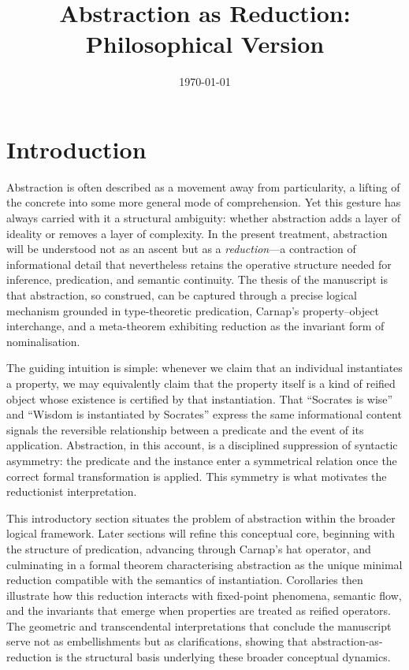 \documentclass[12pt,letterpaper]{article}
\title{Abstraction as Reduction: Philosophical Version}
\author{\Flyxion}
\date{\today}
\begin{document}
\maketitle

\section{Introduction}

Abstraction is often described as a movement away from particularity, a lifting of the concrete into some more general mode of comprehension. Yet this gesture has always carried with it a structural ambiguity: whether abstraction adds a layer of ideality or removes a layer of complexity. In the present treatment, abstraction will be understood not as an ascent but as a \emph{reduction}—a contraction of informational detail that nevertheless retains the operative structure needed for inference, predication, and semantic continuity. The thesis of the manuscript is that abstraction, so construed, can be captured through a precise logical mechanism grounded in type-theoretic predication, Carnap’s property–object interchange, and a meta-theorem exhibiting reduction as the invariant form of nominalisation.

The guiding intuition is simple: whenever we claim that an individual instantiates a property, we may equivalently claim that the property itself is a kind of reified object whose existence is certified by that instantiation. That “Socrates is wise” and “Wisdom is instantiated by Socrates” express the same informational content signals the reversible relationship between a predicate and the event of its application. Abstraction, in this account, is a disciplined suppression of syntactic asymmetry: the predicate and the instance enter a symmetrical relation once the correct formal transformation is applied. This symmetry is what motivates the reductionist interpretation.

This introductory section situates the problem of abstraction within the broader logical framework. Later sections will refine this conceptual core, beginning with the structure of predication, advancing through Carnap’s hat operator, and culminating in a formal theorem characterising abstraction as the unique minimal reduction compatible with the semantics of instantiation. Corollaries then illustrate how this reduction interacts with fixed-point phenomena, semantic flow, and the invariants that emerge when properties are treated as reified operators. The geometric and transcendental interpretations that conclude the manuscript serve not as embellishments but as clarifications, showing that abstraction-as-reduction is the structural basis underlying these broader conceptual dynamics.
\end{document}
